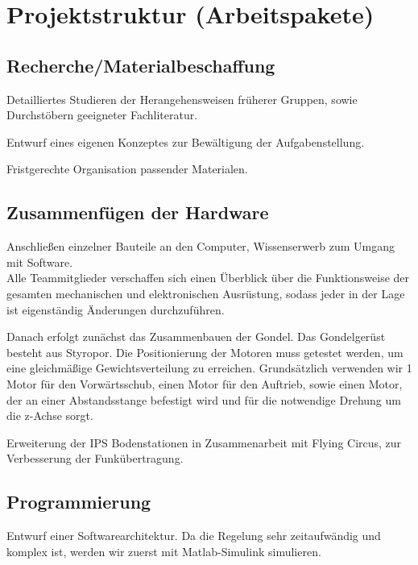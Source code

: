 \documentclass[lang=ngerman,inputenc=utf8,fontsize=10pt]{ldvarticle}
\begin{document}
\section{Projektstruktur (Arbeitspakete)}


\subsection*{Recherche/Materialbeschaffung}

Detailliertes Studieren der Herangehensweisen früherer Gruppen, sowie Durchstöbern geeigneter Fachliteratur.

Entwurf eines eigenen Konzeptes zur Bewältigung der Aufgabenstellung.

Fristgerechte Organisation passender Materialen.
 

\subsection*{Zusammenfügen der Hardware}

Anschließen einzelner Bauteile an den Computer, Wissenserwerb zum Umgang mit Software.\\
Alle Teammitglieder verschaffen sich einen Überblick über die Funktionsweise der gesamten mechanischen und elektronischen Ausrüstung, sodass jeder in der Lage ist eigenständig Änderungen durchzuführen.

Danach erfolgt zunächst das Zusammenbauen der Gondel. Das Gondelgerüst besteht aus Styropor. Die Positionierung der Motoren muss getestet werden, um eine gleichmäßige Gewichtsverteilung zu erreichen. Grundsätzlich verwenden wir 1 Motor für den Vorwärtsschub, einen Motor für den Auftrieb, sowie einen Motor, der an einer Abstandsstange befestigt wird und für die notwendige Drehung um die z-Achse sorgt.

Erweiterung der IPS Bodenstationen in Zusammenarbeit mit Flying Circus, zur Verbesserung der Funkübertragung. 
\newpage 
\subsection*{Programmierung}
Entwurf einer Softwarearchitektur.
Da die Regelung sehr zeitaufwändig und komplex ist, werden wir zuerst mit Matlab-Simulink simulieren.
\end{document}
